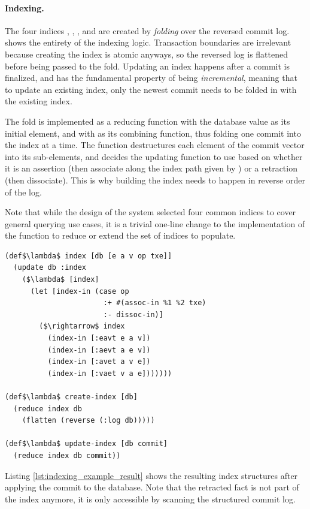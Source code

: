 \paragraph{Indexing.} The four indices , , , and  are created by \emph{folding} over the reversed commit log.  shows the entirety of the indexing logic. Transaction boundaries are irrelevant because creating the index is atomic anyways, so the reversed log is flattened before being passed to the fold. Updating an index happens after a commit is finalized, and has the fundamental property of being \emph{incremental}, meaning that to update an existing index, only the newest commit needs to be folded in with the existing index.

The fold is implemented as a reducing function with the database value as its initial element, and with  as its combining function, thus folding one commit into the index at a time. The  function destructures each element of the commit vector into its sub-elements, and decides the updating function to use based on whether it is an assertion (then associate  along the index path given by ) or a retraction (then dissociate). This is why building the index needs to happen in reverse order of the log.

Note that while the design of the system selected four common indices to cover general querying use cases, it is a trivial one-line change to the implementation of the  function to reduce or extend the set of indices to populate.

\begin{lstlisting}[label={lst:index_code},morekeywords={:eavt,:avet,:aevt,:vaet,flatten,def,assoc-in,dissoc-in},caption=Updating the index]
(def$\lambda$ index [db [e a v op txe]]
  (update db :index
    ($\lambda$ [index]
      (let [index-in (case op
                       :+ #(assoc-in %1 %2 txe)
                       :- dissoc-in)]
        ($\rightarrow$ index
          (index-in [:eavt e a v])
          (index-in [:aevt a e v])
          (index-in [:avet a v e])
          (index-in [:vaet v a e]))))))

(def$\lambda$ create-index [db]
  (reduce index db
    (flatten (reverse (:log db)))))

(def$\lambda$ update-index [db commit]
  (reduce index db commit))
\end{lstlisting}

Listing \ref{lst:indexing_example_result} shows the resulting index structures after applying the commit to the database. Note that the retracted fact is not part of the index anymore, it is only accessible by scanning the structured commit log.

